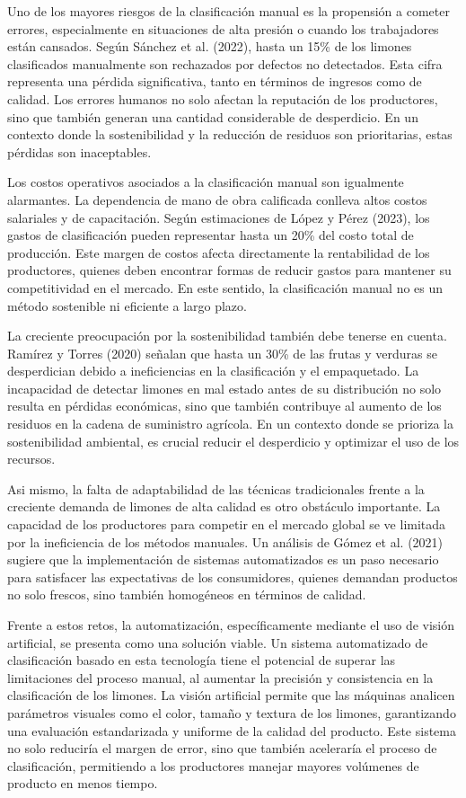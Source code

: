 Uno de los mayores riesgos de la clasificación manual es la propensión a cometer errores, especialmente en situaciones de alta presión o cuando los trabajadores están cansados. Según Sánchez et al. (2022), hasta un 15\% de los limones clasificados manualmente son rechazados por defectos no detectados. Esta cifra representa una pérdida significativa, tanto en términos de ingresos como de calidad. Los errores humanos no solo afectan la reputación de los productores, sino que también generan una cantidad considerable de desperdicio. En un contexto donde la sostenibilidad y la reducción de residuos son prioritarias, estas pérdidas son inaceptables.

Los costos operativos asociados a la clasificación manual son igualmente alarmantes. La dependencia de mano de obra calificada conlleva altos costos salariales y de capacitación. Según estimaciones de López y Pérez (2023), los gastos de clasificación pueden representar hasta un 20\% del costo total de producción. Este margen de costos afecta directamente la rentabilidad de los productores, quienes deben encontrar formas de reducir gastos para mantener su competitividad en el mercado. En este sentido, la clasificación manual no es un método sostenible ni eficiente a largo plazo.

La creciente preocupación por la sostenibilidad también debe tenerse en cuenta. Ramírez y Torres (2020) señalan que hasta un 30\% de las frutas y verduras se desperdician debido a ineficiencias en la clasificación y el empaquetado. La incapacidad de detectar limones en mal estado antes de su distribución no solo resulta en pérdidas económicas, sino que también contribuye al aumento de los residuos en la cadena de suministro agrícola. En un contexto donde se prioriza la sostenibilidad ambiental, es crucial reducir el desperdicio y optimizar el uso de los recursos.

Asi mismo, la falta de adaptabilidad de las técnicas tradicionales frente a la creciente demanda de limones de alta calidad es otro obstáculo importante. La capacidad de los productores para competir en el mercado global se ve limitada por la ineficiencia de los métodos manuales. Un análisis de Gómez et al. (2021) sugiere que la implementación de sistemas automatizados es un paso necesario para satisfacer las expectativas de los consumidores, quienes demandan productos no solo frescos, sino también homogéneos en términos de calidad.

Frente a estos retos, la automatización, específicamente mediante el uso de visión artificial, se presenta como una solución viable. Un sistema automatizado de clasificación basado en esta tecnología tiene el potencial de superar las limitaciones del proceso manual, al aumentar la precisión y consistencia en la clasificación de los limones. La visión artificial permite que las máquinas analicen parámetros visuales como el color, tamaño y textura de los limones, garantizando una evaluación estandarizada y uniforme de la calidad del producto. Este sistema no solo reduciría el margen de error, sino que también aceleraría el proceso de clasificación, permitiendo a los productores manejar mayores volúmenes de producto en menos tiempo.

